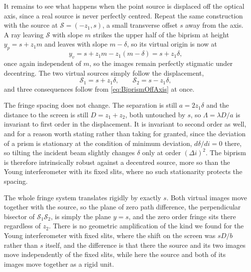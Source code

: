         It remains to see what happens when the point source is displaced off the optical axis, since a real source is never perfectly centred. Repeat the same construction with the source at $\mathcal{S} = (-z_1,s)$, a small transverse offset $s$ away from the axis. A ray leaving $\mathcal{S}$ with slope $m$ strikes the upper half of the biprism at height $y_p = s+z_1 m$ and leaves with slope $m-\delta$, so its virtual origin is now at
        \begin{equation}
            y_v = s + z_1 m - z_1(m-\delta) = s + z_1\delta,
        \end{equation}
        once again independent of $m$, so the images remain perfectly stigmatic under decentring. The two virtual sources simply follow the displacement,
        \begin{equation}\label{eq:BiprismOffAxis}
            \mathcal{S}_1 = s+z_1\delta, \qquad \mathcal{S}_2 = s-z_1\delta,
        \end{equation}
        and three consequences follow from \ref{eq:BiprismOffAxis} at once.

        The fringe spacing does not change. The separation is still $a = 2z_1\delta$ and the distance to the screen is still $D=z_1+z_2$, both untouched by $s$, so $\Lambda = \lambda D/a$ is invariant to first order in the displacement. It is invariant to second order as well, and for a reason worth stating rather than taking for granted, since the deviation of a prism is stationary at the condition of minimum deviation, $d\delta/di = 0$ there, so tilting the incident beam slightly changes $\delta$ only at order $(\Delta i)^2$. The biprism is therefore intrinsically robust against a decentred source, more so than the Young interferometer with its fixed slits, where no such stationarity protects the spacing.

        The whole fringe system translates rigidly by exactly $s$. Both virtual images move together with the source, so the plane of zero path difference, the perpendicular bisector of $\mathcal{S}_1\mathcal{S}_2$, is simply the plane $y=s$, and the zero order fringe sits there regardless of $z_2$. There is no geometric amplification of the kind we found for the Young interferometer with fixed slits, where the shift on the screen was $sD/b$ rather than $s$ itself, and the difference is that there the source and its two images move independently of the fixed slits, while here the source and both of its images move together as a rigid unit.

